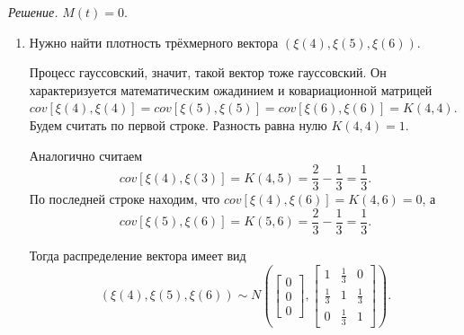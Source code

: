 \textit{Решение.}
$M \left( t \right) =
  0$.
\begin{enumerate}[label=\alph*)]
  \item Нужно найти плотность трёхмерного вектора
  $ \left( \xi \left( 4 \right), \xi \left( 5 \right), \xi \left( 6 \right) \right) $.

  Процесс гауссовский, значит, такой вектор тоже гауссовский.
  Он характеризуется математическим ожадинием и ковариационной матрицей
  $cov \left[ \xi \left( 4 \right), \xi \left( 4 \right) \right] =
    cov \left[ \xi \left( 5 \right), \xi \left( 5 \right) \right] =
    cov \left[ \xi \left( 6 \right), \xi \left( 6 \right) \right] =
    K \left( 4, 4 \right) $.
  Будем считать по первой строке.
  Разность равна нулю $K \left( 4, 4 \right) = 1$.

  Аналогично считаем
  $$cov \left[ \xi \left( 4 \right), \xi \left( 3 \right) \right] =
    K \left( 4, 5 \right) =
    \frac{2}{3} - \frac{1}{3} =
    \frac{1}{3}.$$
  По последней строке находим,
  что $cov \left[ \xi \left( 4 \right), \xi \left( 6 \right)\right] = K \left( 4, 6 \right) = 0$, а
  $$cov \left[ \xi \left( 5 \right), \xi \left( 6 \right) \right] =
    K \left( 5, 6 \right) =
    \frac{2}{3} - \frac{1}{3} =
    \frac{1}{3}.$$

  Тогда распределение вектора имеет вид
  $$ \left( \xi \left( 4 \right), \xi \left( 5 \right), \xi \left( 6 \right) \right) \sim
    N \left(
      \begin{bmatrix}
        0 \\
        0 \\
        0
      \end{bmatrix},
      \begin{bmatrix}
        1 & \frac{1}{3} & 0 \\
        \frac{1}{3} & 1 & \frac{1}{3} \\
        0 & \frac{1}{3} & 1
      \end{bmatrix}
    \right).$$


\end{enumerate}
